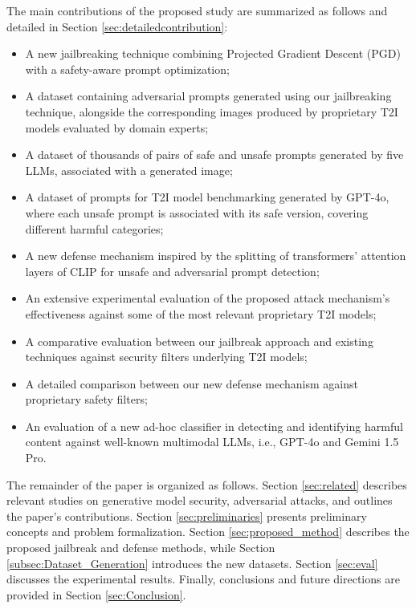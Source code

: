 \documentclass[acmsmall]{acmart}
\begin{document}
\noindent
The main contributions of the proposed study are summarized as follows and detailed in Section \ref{sec:detailedcontribution}:
\begin{itemize}
    \item A new jailbreaking technique combining Projected Gradient Descent (PGD) with a safety-aware prompt optimization;
    \item A dataset containing adversarial prompts generated using our jailbreaking technique, alongside the corresponding images produced by proprietary T2I models evaluated by domain experts;
    \item A dataset of thousands of pairs of safe and unsafe prompts generated by five LLMs, associated with a generated image;
    \item A dataset of prompts for T2I model benchmarking generated by GPT-4o, where each unsafe prompt is associated with its safe version, covering different harmful categories;
    \item A new defense mechanism inspired by the splitting of transformers' attention layers of CLIP \cite{ramesh2022hierarchical} for unsafe and adversarial prompt detection;
    \item An extensive experimental evaluation of the proposed attack mechanism's effectiveness against some of the most relevant proprietary T2I models;
    \item A comparative evaluation between our jailbreak approach and existing techniques against security filters underlying T2I models;
    \item A detailed comparison between our new defense mechanism against proprietary safety filters;
    \item An evaluation of a new ad-hoc classifier in detecting and identifying harmful content against
    well-known multimodal LLMs, i.e., GPT-4o and Gemini 1.5 Pro.
\end{itemize}
The remainder of the paper is organized as follows. Section \ref{sec:related} describes relevant studies on generative model security, adversarial attacks, and outlines the paper's contributions. Section \ref{sec:preliminaries} presents preliminary concepts and problem formalization. Section \ref{sec:proposed_method} describes the proposed jailbreak and defense methods, while Section \ref{subsec:Dataset_Generation} introduces the new datasets. Section \ref{sec:eval} discusses the experimental results. Finally, conclusions and future directions are provided in Section \ref{sec:Conclusion}.
\end{document}

